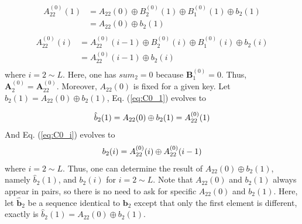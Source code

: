 \documentclass[final,3p,times,twocolumn]{elsarticle}
\begin{document}
\begin{equation}
\begin{aligned}
A_{22}^{(0)}(1) & = A_{22}(0) \oplus B_2^{(0)}(1) \oplus B_{1}^{(0)}(1) \oplus b_{2}(1)\\
& = A_{22}(0) \oplus b_{2}(1)\\
\end{aligned}
\label{eq:C0_1}	
\end{equation}
\begin{equation}
\begin{aligned}
A_{22}^{(0)}(i) & = A_{22}^{(0)}(i-1) \oplus B_2^{(0)}(i) \oplus B_{1}^{(0)}(i) \oplus b_{2}(i)\\
& = A_{22}^{(0)}(i-1) \oplus b_{2}(i)\\
\end{aligned}
\label{eq:C0_i}	
\end{equation}
where $i=2 \sim L$. Here, one has $sum_2=0$ because $\bm{B}_1^{(0)}=0$. Thus, $\bm{A}_2^{(0)}=\bm{A}_{22}^{(0)}$. Moreover, $A_{22}(0)$ is fixed for a given key. Let $\hat{b}_{2}(1)=A_{22}(0) \oplus b_{2}(1)$, Eq. (\ref{eq:C0_1}) evolves to

\begin{equation*}
\hat{b}_{2}(1)=A_{22}(0) \oplus b_{2}(1)=A_{22}^{(0)}(1) \\
\end{equation*}
And Eq. (\ref{eq:C0_i}) evolves to
\begin{equation*}
b_{2}(i) = A_{22}^{(0)}(i) \oplus A_{22}^{(0)}(i-1) \\
\end{equation*}
where $i=2 \sim L$. Thus, one can determine the result of $A_{22}(0) \oplus b_{2}(1)$, namely $\hat{b}_{2}(1)$, and $b_{2}(i)$ for $i=2 \sim L$. Note that $A_{22}(0)$ and $b_{2}(1)$ always appear in pairs, so there is no need to ask for specific $A_{22}(0)$ and $b_{2}(1)$. Here, let $\bm{\hat{b}}_2$ be a sequence identical to $\bm{b}_2$ except that only the first element is different, exactly is $\hat{b}_{2}(1)=A_{22}(0) \oplus b_{2}(1)$.
\end{document}
